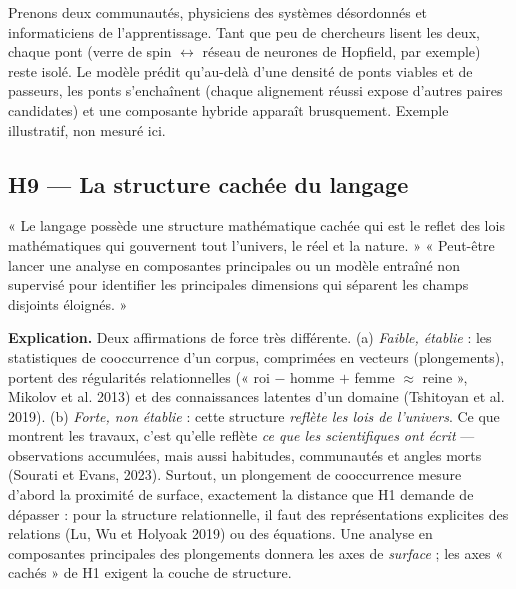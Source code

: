 \documentclass[a4paper,11pt]{article}
\begin{document}
\begin{exemple}
Prenons deux communautés, physiciens des systèmes désordonnés et informaticiens de l'apprentissage. Tant que peu de chercheurs lisent les deux, chaque pont (verre de spin $\leftrightarrow$ réseau de neurones de Hopfield, par exemple) reste isolé. Le modèle prédit qu'au-delà d'une densité de ponts viables et de passeurs, les ponts s'enchaînent (chaque alignement réussi expose d'autres paires candidates) et une composante hybride apparaît brusquement. Exemple illustratif, non mesuré ici.
\end{exemple}

\subsection{H9 — La structure cachée du langage}
\begin{enonce}
« Le langage possède une structure mathématique cachée qui est le reflet des lois mathématiques qui gouvernent tout l'univers, le réel et la nature. » « Peut-être lancer une analyse en composantes principales ou un modèle entraîné non supervisé pour identifier les principales dimensions qui séparent les champs disjoints éloignés. »
\end{enonce}

\textbf{Explication.} Deux affirmations de force très différente. (a) \emph{Faible, établie} : les statistiques de cooccurrence d'un corpus, comprimées en vecteurs (plongements), portent des régularités relationnelles (« roi $-$ homme $+$ femme $\approx$ reine », Mikolov et al. 2013) et des connaissances latentes d'un domaine (Tshitoyan et al. 2019). (b) \emph{Forte, non établie} : cette structure \emph{reflète les lois de l'univers}. Ce que montrent les travaux, c'est qu'elle reflète \emph{ce que les scientifiques ont écrit} — observations accumulées, mais aussi habitudes, communautés et angles morts (Sourati et Evans, 2023). Surtout, un plongement de cooccurrence mesure d'abord la proximité de surface, exactement la distance que H1 demande de dépasser : pour la structure relationnelle, il faut des représentations explicites des relations (Lu, Wu et Holyoak 2019) ou des équations. Une analyse en composantes principales des plongements donnera les axes de \emph{surface} ; les axes « cachés » de H1 exigent la couche de structure.
\end{document}
